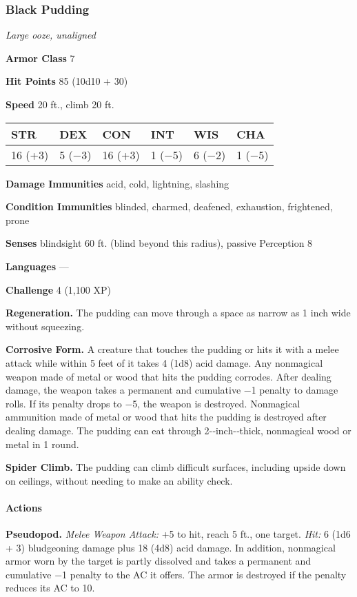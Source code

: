 \documentclass[
]{article}
\begin{document}
\hypertarget{black-pudding}{%
\subsubsection{Black Pudding}\label{black-pudding}}

\emph{Large ooze, unaligned}

\textbf{Armor Class} 7

\textbf{Hit Points} 85 (10d10 + 30)

\textbf{Speed} 20 ft., climb 20 ft.

\begin{longtable}[]{@{}llllll@{}}
\toprule
STR & DEX & CON & INT & WIS & CHA\tabularnewline
\midrule
\endhead
16 (+3) & 5 (−3) & 16 (+3) & 1 (−5) & 6 (−2) & 1 (−5)\tabularnewline
\bottomrule
\end{longtable}

\textbf{Damage Immunities} acid, cold, lightning, slashing

\textbf{Condition Immunities} blinded, charmed, deafened, exhaustion,
frightened, prone

\textbf{Senses} blindsight 60 ft. (blind beyond this radius), passive
Perception 8

\textbf{Languages} ---

\textbf{Challenge} 4 (1,100 XP)

\textbf{Regeneration.} The pudding can move through a space as narrow as
1 inch wide without squeezing.

\textbf{Corrosive Form.} A creature that touches the pudding or hits it
with a melee attack while within 5 feet of it takes 4 (1d8) acid damage.
Any nonmagical weapon made of metal or wood that hits the pudding
corrodes. After dealing damage, the weapon takes a permanent and
cumulative −1 penalty to damage rolls. If its penalty drops to −5, the
weapon is destroyed. Nonmagical ammunition made of metal or wood that
hits the pudding is destroyed after dealing damage. The pudding can eat
through 2-­‐inch-­‐thick, nonmagical wood or metal in 1 round.

\textbf{Spider Climb.} The pudding can climb difficult surfaces,
including upside down on ceilings, without needing to make an ability
check.

\hypertarget{actions-2}{%
\paragraph{Actions}\label{actions-2}}

\textbf{Pseudopod.} \emph{Melee Weapon Attack:} +5 to hit, reach 5 ft.,
one target. \emph{Hit:} 6 (1d6 + 3) bludgeoning damage plus 18 (4d8)
acid damage. In addition, nonmagical armor worn by the target is partly
dissolved and takes a permanent and cumulative −1 penalty to the AC it
offers. The armor is destroyed if the penalty reduces its AC to 10.
\end{document}
